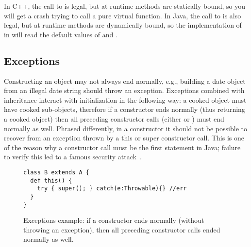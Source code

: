 In C++, the call to  is legal,
    but at runtime
    methods are statically bound,
    so you will get a crash trying to call a pure virtual function.
In Java, the call to  is also legal,
    but at runtime
    methods are dynamically bound,
    so the implementation of  in 
    will read the default values of  and .




\subsection{Exceptions}
Constructing an object may not always end normally,
    e.g., building a date object from an illegal date string should throw an exception.
Exceptions combined with inheritance interact with initialization in the following way:
    a cooked object must have cooked sub-objects,
    therefore if a constructor ends normally (thus returning a cooked object)
    then all preceding constructor calls (either  or )
    must end normally as well.
Phrased differently, in a constructor it should not be possible to
    recover from an exception thrown by a this or super constructor call.
This is one of the reason why a constructor call must be the first statement in Java;
    failure to verify this led to a famous security attack~\cite{Dean:1996}.

\begin{figure}
\vspace{-0.2cm}\begin{lstlisting}
class B extends A {
  def this() {
    try { super(); } catch(e:Throwable){} //err
  }
}
\end{lstlisting}\vspace{-0.2cm}
\caption{Exceptions example:
    if a constructor ends normally (without throwing an exception),
        then all preceding constructor calls ended normally as well.
    }
\label{Figure:Exceptions}
\end{figure}


